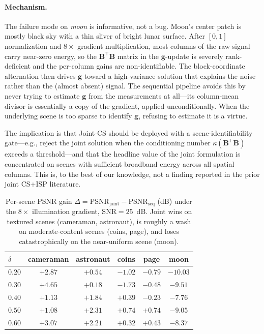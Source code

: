 \documentclass{article}
\begin{document}
\paragraph{Mechanism.} The failure mode on \emph{moon} is informative, not a bug. Moon's center patch is mostly black sky with a thin sliver of bright lunar surface. After $[0,1]$ normalization and $8\times$ gradient multiplication, most columns of the raw signal carry near-zero energy, so the $\boldsymbol{B}^\top \boldsymbol{B}$ matrix in the $\boldsymbol{g}$-update is severely rank-deficient and the per-column gains are non-identifiable. The block-coordinate alternation then drives $\boldsymbol{g}$ toward a high-variance solution that explains the noise rather than the (almost absent) signal. The sequential pipeline avoids this by never trying to estimate $\boldsymbol{g}$ from the measurements at all---its column-mean divisor is essentially a copy of the gradient, applied unconditionally. When the underlying scene is too sparse to identify $\boldsymbol{g}$, refusing to estimate it is a virtue.

The implication is that Joint-CS should be deployed with a scene-identifiability gate---e.g., reject the joint solution when the conditioning number $\kappa(\boldsymbol{B}^\top\boldsymbol{B})$ exceeds a threshold---and that the headline value of the joint formulation is concentrated on scenes with sufficient broadband energy across all spatial columns. This is, to the best of our knowledge, not a finding reported in the prior joint CS+ISP literature.

\begin{table}[t]
  \caption{Per-scene PSNR gain $\Delta = \text{PSNR}_\text{joint} - \text{PSNR}_\text{seq}$ (dB) under the $8\times$ illumination gradient, SNR${=}25$~dB. Joint wins on textured scenes (cameraman, astronaut), is roughly a wash on moderate-content scenes (coins, page), and loses catastrophically on the near-uniform scene (moon).}
  \label{tab:joint-perscene}
  \centering
  \begin{tabular}{lccccc}
    \toprule
    $\delta$ & cameraman & astronaut & coins & page & moon \\
    \midrule
    $0.20$ & $\mathbf{+2.87}$ & $\mathbf{+0.54}$ & $-1.02$         & $-0.79$         & $-10.03$ \\
    $0.30$ & $\mathbf{+4.65}$ & $\mathbf{+0.18}$ & $-1.73$         & $-0.48$         & $-9.51$  \\
    $0.40$ & $\mathbf{+1.13}$ & $\mathbf{+1.84}$ & $\mathbf{+0.39}$ & $-0.23$         & $-7.76$  \\
    $0.50$ & $\mathbf{+1.08}$ & $\mathbf{+2.31}$ & $\mathbf{+0.74}$ & $\mathbf{+0.74}$ & $-9.05$  \\
    $0.60$ & $\mathbf{+3.07}$ & $\mathbf{+2.21}$ & $\mathbf{+0.32}$ & $\mathbf{+0.43}$ & $-8.37$  \\
    \bottomrule
  \end{tabular}
\end{table}
\end{document}
